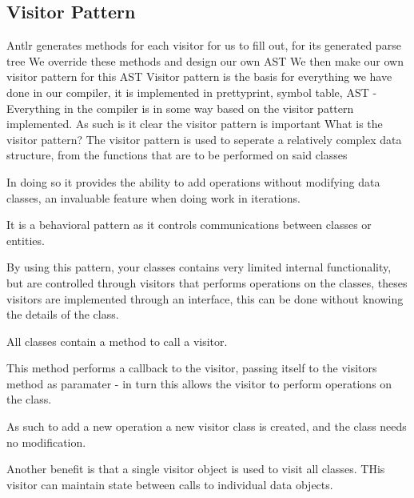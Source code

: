 \subsection*{Visitor Pattern}\label{subs:visit}
Antlr generates methods for each visitor for us to fill out, for its generated parse tree
We override these methods and design our own AST
We then make our own visitor pattern for this AST
Visitor pattern is the basis for everything we have done in our compiler, it is implemented in prettyprint, symbol table, AST - Everything in the compiler is in some way based on the visitor pattern implemented.
As such is it clear the visitor pattern is important
What is the visitor pattern?
The visitor pattern is used to seperate a relatively complex data structure, from the functions that are to be performed on said classes

In doing so it provides the ability to add operations without modifying data classes, an invaluable feature when doing work in iterations.

It is a behavioral pattern as it controls communications between classes or entities.

By using this pattern, your classes contains very limited internal functionality, but are controlled through visitors that performs operations on the classes, theses visitors are implemented through an interface, this can be done without knowing the details of the class.

All classes contain a method to call a visitor.

This method performs a callback to the visitor, passing itself to the visitors method as paramater - in turn this allows the visitor to perform operations on the class.

As such to add a new operation a new visitor class is created, and the class needs no modification.

Another benefit is that a single visitor object is used to visit all classes.
THis visitor can maintain state between calls to individual data objects.
